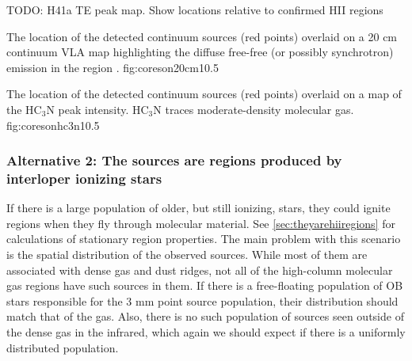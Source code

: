\documentclass{emulateapj}
\begin{document}
% 
% 

TODO: H41a TE peak map.  Show locations relative to confirmed HII regions

{The location of the detected continuum sources (red points) overlaid on a 20
cm continuum VLA map highlighting the diffuse free-free (or possibly
synchrotron) emission in the region \citep{Yusef-Zadeh2004a}.}
{fig:coreson20cm}{1}{0.5\textwidth}

{The location of the detected continuum sources (red points) overlaid on a map
of the HC$_3$N peak intensity.  HC$_3$N traces moderate-density molecular gas.}
{fig:coresonhc3n}{1}{0.5\textwidth}

\subsubsection{Alternative 2: The sources are \hii regions produced by interloper ionizing stars}
If there is a large population of older, but still ionizing, stars, they could
ignite \hii regions when they fly through molecular material.  See
\ref{sec:theyarehiiregions} for calculations of stationary \hii region
properties.  The main problem with this scenario is the spatial distribution of
the observed sources.  While most of them are associated with dense gas and dust ridges,
not all of the high-column molecular gas regions have such sources in them.  If
there is a free-floating population of OB stars responsible for the 3 mm point
source population, their distribution should match that of the gas.  Also,
there is no such population of sources seen outside of the dense gas in the
infrared, which again we should expect if there is a uniformly distributed
population.  
\end{document}
